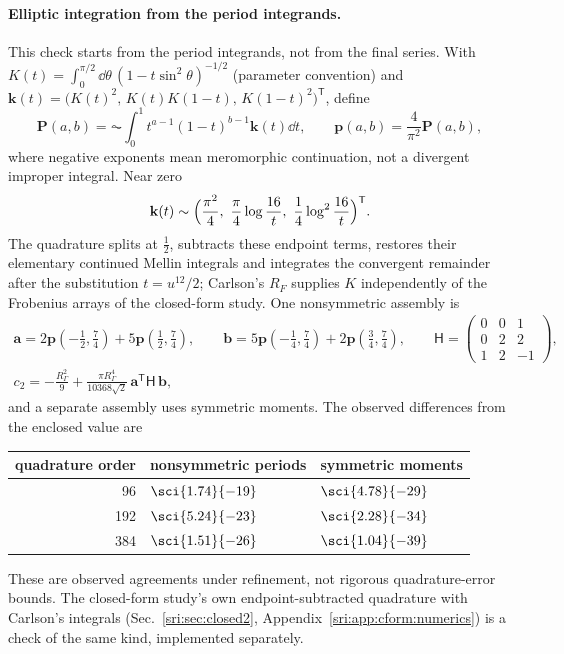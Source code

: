 \paragraph{Elliptic integration from the period integrands.} This check starts from the period integrands, not from the final series.
With $K(t)=\int_0^{\pi/2}\dd\theta\,(1-t\sin^2\theta)^{-1/2}$ (parameter convention) and
$\mathbf k(t)=\bigl(K(t)^2,\,K(t)K(1-t),\,K(1-t)^2\bigr)^{\mathsf T}$, define
\begin{equation}
 \mathbf P(a,b)=\AC\!\int_0^1t^{a-1}(1-t)^{b-1}\mathbf k(t)\dd t,\qquad \mathbf p(a,b)=\frac4{\pi^2}\mathbf P(a,b),
\end{equation}
where negative exponents mean meromorphic continuation, not a divergent improper integral. Near zero
\begin{equation}
 \mathbf k(t)\sim\Bigl(\frac{\pi^2}4,\ \frac\pi4\log\frac{16}t,\ \frac14\log^2\frac{16}t\Bigr)^{\mathsf T}.
\end{equation}
The quadrature splits at $\frac12$, subtracts these endpoint terms, restores their elementary continued Mellin
integrals and integrates the convergent remainder after the substitution $t=u^{12}/2$; Carlson's $R_F$ supplies $K$
independently of the Frobenius arrays of the closed-form study. One nonsymmetric assembly is
\begin{equation}
\begin{gathered}
 \mathbf a=2\mathbf p(-\tfrac12,\tfrac74)+5\mathbf p(\tfrac12,\tfrac74),\qquad
 \mathbf b=5\mathbf p(-\tfrac14,\tfrac74)+2\mathbf p(\tfrac34,\tfrac74),\qquad
 \mathsf H=\begin{pmatrix}0&0&1\\0&2&2\\1&2&-1\end{pmatrix},\\
 c_2=-\frac{R_\Gamma^2}9+\frac{\pi R_\Gamma^4}{10368\sqrt2}\,\mathbf a^{\mathsf T}\mathsf H\,\mathbf b,
\end{gathered}
\end{equation}
and a separate assembly uses symmetric moments. The observed differences from the enclosed value are
\begin{center}\small
\begin{tabular}{@{}rll@{}}
\toprule
quadrature order & nonsymmetric periods & symmetric moments\\
\midrule
96 & $\sci{1.74}{-19}$ & $\sci{4.78}{-29}$\\
192 & $\sci{5.24}{-23}$ & $\sci{2.28}{-34}$\\
384 & $\sci{1.51}{-26}$ & $\sci{1.04}{-39}$\\
\bottomrule
\end{tabular}
\end{center}
These are observed agreements under refinement, not rigorous quadrature-error bounds. The closed-form study's own
endpoint-subtracted quadrature with Carlson's integrals (Sec.~\ref{sri:sec:closed2}, Appendix~\ref{sri:app:cform:numerics}) is a check of the same kind,
implemented separately.


